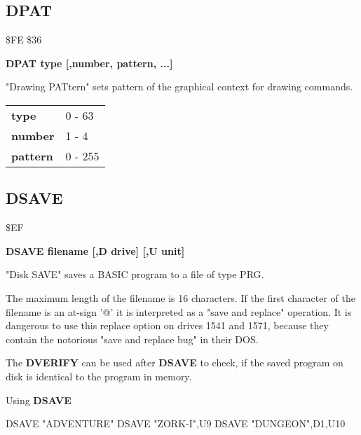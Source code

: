 
\newpage
\subsection{DPAT}
\begin{description}[leftmargin=3cm,style=nextline]
\item [Token:] \$FE \$36
\item [Format:] {\bf DPAT type [,number, pattern, ...]}
\item [Usage:]
   "Drawing PATtern" sets pattern
   of the graphical context for drawing commands.

\ttfamily
\begin{tabular}{|l|l|}
\hline
   {\bf type}       &  0 - 63 \\
   {\bf number}     &  1 - 4 \\
   {\bf pattern}    &  0 - 255 \\
\hline
\end{tabular}
\end{description}


\newpage
\subsection{DSAVE}
\begin{description}[leftmargin=3cm,style=nextline]
\item [Token:] \$EF
\item [Format:] {\bf DSAVE filename [,D drive] [,U unit] }
\item [Usage:]
   "Disk SAVE" saves a BASIC program to
   a file of type PRG.

   \filenamedefinition
   The maximum length of the filename is 16 characters.
   If the first character of the filename is an at-sign '@' it
   is interpreted as a "save and replace" operation. It is dangerous
   to use this replace option on drives 1541 and 1571, because they
   contain the notorious "save and replace bug" in their DOS.

   \drivedefinition

   \unitdefinition

\item [Remarks:]
   The {\bf DVERIFY} can be used after {\bf DSAVE} to check,
   if the saved program on disk is identical to the program
   in memory.

\item [Example:] Using {\bf DSAVE}
\begin{screenoutput}
  DSAVE "ADVENTURE"
  DSAVE "ZORK-I",U9
  DSAVE "DUNGEON",D1,U10
\end{screenoutput}
\end{description}

